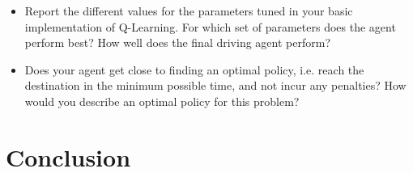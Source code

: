 \documentclass[twoside,openright,titlepage,numbers=noenddot,headinclude,%
               footinclude=true,cleardoublepage=empty,abstractoff,BCOR=5mm,%
               paper=a4,fontsize=11pt,ngerman,american]{scrreprt}
\numberwithin{theorem}{chapter}
\numberwithin{definition}{chapter}
\numberwithin{algorithm}{chapter}
\numberwithin{figure}{chapter}
\numberwithin{table}{chapter}
\numberwithin{equation}{chapter}
\begin{document}
\begin{itemize}
\item Report the different values for the parameters tuned in your basic implementation of Q-Learning. For which set of parameters does the agent perform best? How well does the final driving agent perform?
\item Does your agent get close to finding an optimal policy, i.e. reach the destination in the minimum possible time, and not incur any penalties? How would you describe an optimal policy for this problem?

\end{itemize}

%
%

\chapter*{Conclusion}
\end{document}
